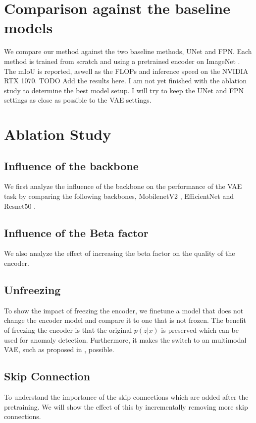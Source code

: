 \section{Comparison against the baseline models}
We compare our method against the two baseline methods, UNet and FPN. Each method is trained from scratch and using a pretrained encoder on ImageNet \cite{deng2009imagenet}. The mIoU is reported, aswell as the FLOPs and inference speed on the NVIDIA RTX 1070. 
TODO Add the results here. I am not yet finished with the ablation study to determine the best model setup. I will try to keep the UNet and FPN settings as close as possible to the VAE settings.


\section{Ablation Study}
\subsection{Influence of the backbone}
We first analyze the influence of the backbone on the performance of the VAE task by comparing the following backbones, MobilenetV2 \cite{sandler2019mobilenetv2invertedresidualslinear}, EfficientNet \cite{tan2020efficientnetrethinkingmodelscaling} and Resnet50 \cite{he2015deep}.

\subsection{Influence of the Beta factor}
We also analyze the effect of increasing the beta factor on the quality of the encoder. 

\subsection{Unfreezing}
To show the impact of freezing the encoder, we finetune a model that does not change the encoder model and compare it to one that is not frozen. The benefit of freezing the encoder is that the original $p(z |x)$ is preserved which can be used for anomaly detection. Furthermore, it makes the switch to an multimodal VAE, such as proposed in \cite{vasco2020mhvae}, possible.

\subsection{Skip Connection}
To understand the importance of the skip connections which are added after the pretraining. We will show the effect of this by incrementally removing more skip connections.

